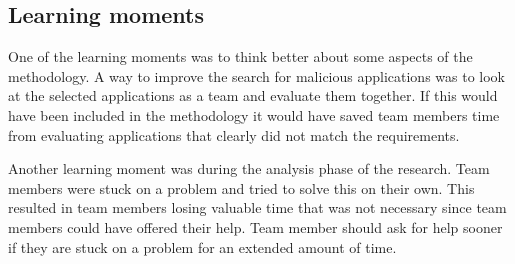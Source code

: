 \subsection{Learning moments}
One of the learning moments was to think better about some aspects of the methodology.
A way to improve the search for malicious applications was to look at the selected applications as a team and evaluate them together.
If this would have been included in the methodology it would have saved team members time from evaluating applications that clearly did not match the requirements. 

Another learning moment was during the analysis phase of the research.
Team members were stuck on a problem and tried to solve this on their own.
This resulted in team members losing valuable time that was not necessary since team members could have offered their help.
Team member should ask for help sooner if they are stuck on a problem for an extended amount of time.